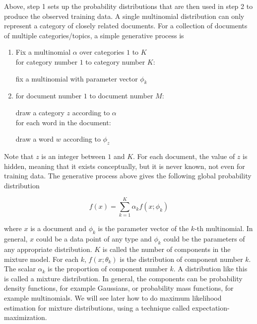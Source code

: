 \documentclass[12pt]{report}
\begin{document}
Above, step 1 sets up the probability distributions that are then used in step 2 to produce the observed training data. A single multinomial distribution can only represent a category of closely related documents. For a collection of documents of multiple categories/topics, a simple
generative process is

\vspace{3mm}

\begin{enumerate}
\item Fix a multinomial $\alpha$ over categories $1$ to $K$\\
for category number $1$ to category number $K$:
\begin{itemize}
fix a multinomial with parameter vector $\phi_k$
\end{itemize}

\item for document number $1$ to document number $M$:
\begin{itemize}
draw a category $z$ according to $\alpha$\\
for each word in the document:\\
  	\begin{itemize}
  		draw a word $w$ according to $\phi_z$
  	\end{itemize}
\end{itemize}
\end{enumerate}
\vspace{3mm}

Note that $z$ is an integer between $1$ and $K$. For each document, the value of $z$ is hidden, meaning that it exists conceptually, but it is never known, not even for training data. The generative process above gives the following global probability distribution\par
\vspace{3mm}

\begin{equation}
f(x) = \sum\limits_{k=1}^K \alpha_k f(x;\phi_k)
\end{equation}

\vspace{3mm}

where $x$ is a document and $\phi_k$ is the parameter vector of the $k$-th multinomial. In general, $x$ could be a data point of any type and $\phi_k$ could be the parameters of any appropriate distribution. $K$ is called the number of components in the mixture model. For each $k$, $f (x; \theta_k)$ is the distribution of component number $k$. The scalar $\alpha_k$ is the proportion of component number $k$. A distribution like this is called a mixture distribution. In general, the components can be probability density functions, for example Gaussians, or probability mass functions, for example multinomials. We will see later how to do maximum likelihood estimation for mixture distributions, using a technique called expectation-maximization.\par
\end{document}
